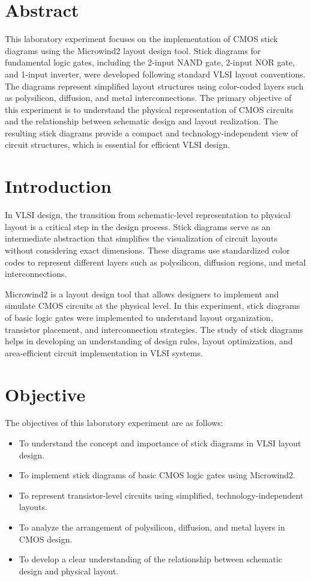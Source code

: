 \documentclass[12pt,a4paper]{article}
\begin{document}
\tableofcontents
\thispagestyle{empty}
\clearpage
{}

\section*{\center Abstract}
This laboratory experiment focuses on the implementation of CMOS stick diagrams using the Microwind2 layout design tool. Stick diagrams for fundamental logic gates, including the 2-input NAND gate, 2-input NOR gate, and 1-input inverter, were developed following standard VLSI layout conventions. The diagrams represent simplified layout structures using color-coded layers such as polysilicon, diffusion, and metal interconnections. The primary objective of this experiment is to understand the physical representation of CMOS circuits and the relationship between schematic design and layout realization. The resulting stick diagrams provide a compact and technology-independent view of circuit structures, which is essential for efficient VLSI design.



\section{Introduction}
In VLSI design, the transition from schematic-level representation to physical layout is a critical step in the design process. Stick diagrams serve as an intermediate abstraction that simplifies the visualization of circuit layouts without considering exact dimensions. These diagrams use standardized color codes to represent different layers such as polysilicon, diffusion regions, and metal interconnections.

Microwind2 is a layout design tool that allows designers to implement and simulate CMOS circuits at the physical level. In this experiment, stick diagrams of basic logic gates were implemented to understand layout organization, transistor placement, and interconnection strategies. The study of stick diagrams helps in developing an understanding of design rules, layout optimization, and area-efficient circuit implementation in VLSI systems.


\section{Objective}
The objectives of this laboratory experiment are as follows:
\begin{itemize}
    \item To understand the concept and importance of stick diagrams in VLSI layout design.
    \item To implement stick diagrams of basic CMOS logic gates using Microwind2.
    \item To represent transistor-level circuits using simplified, technology-independent layouts.
    \item To analyze the arrangement of polysilicon, diffusion, and metal layers in CMOS design.
    \item To develop a clear understanding of the relationship between schematic design and physical layout.
\end{itemize}
\end{document}
